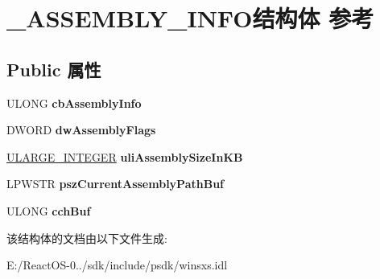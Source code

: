 \hypertarget{struct___a_s_s_e_m_b_l_y___i_n_f_o}{}\section{\+\_\+\+A\+S\+S\+E\+M\+B\+L\+Y\+\_\+\+I\+N\+F\+O结构体 参考}
\label{struct___a_s_s_e_m_b_l_y___i_n_f_o}
\subsection*{Public 属性}
\begin{DoxyCompactItemize}
\item 
\mbox{\label{struct___a_s_s_e_m_b_l_y___i_n_f_o_a0efb71a31c9f75c82a724a46b48611f1}} 
U\+L\+O\+NG {\bfseries cb\+Assembly\+Info}
\item 
\mbox{\label{struct___a_s_s_e_m_b_l_y___i_n_f_o_aa3e3a305f225a379e06d1e8a2ee33578}} 
D\+W\+O\+RD {\bfseries dw\+Assembly\+Flags}
\item 
\mbox{\label{struct___a_s_s_e_m_b_l_y___i_n_f_o_ac8f6d4c1581a3d61c4d8e97c207f1dce}} 
\hyperlink{struct___u_l_a_r_g_e___i_n_t_e_g_e_r}{U\+L\+A\+R\+G\+E\+\_\+\+I\+N\+T\+E\+G\+ER} {\bfseries uli\+Assembly\+Size\+In\+KB}
\item 
\mbox{\label{struct___a_s_s_e_m_b_l_y___i_n_f_o_a8bccf697414b9fd9f1f3ac96a25f5d6b}} 
L\+P\+W\+S\+TR {\bfseries psz\+Current\+Assembly\+Path\+Buf}
\item 
\mbox{\label{struct___a_s_s_e_m_b_l_y___i_n_f_o_a615ff63efe43a8f7987c6426173b6a19}} 
U\+L\+O\+NG {\bfseries cch\+Buf}
\end{DoxyCompactItemize}


该结构体的文档由以下文件生成\+:\begin{DoxyCompactItemize}
\item 
E\+:/\+React\+O\+S-\/0../sdk/include/psdk/winsxs.\+idl\end{DoxyCompactItemize}
